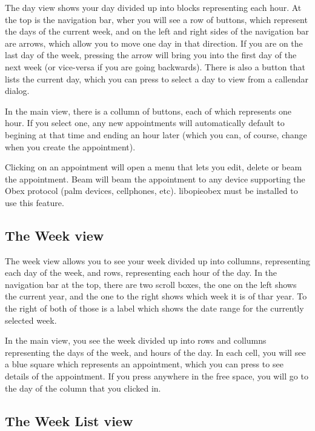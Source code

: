 \documentclass[12pt,letterpaper,oneside, openany]{book} \usepackage[latin1] {inputenc}
\begin{document}
The day view shows your day divided up into blocks representing each hour. At the top is the navigation bar, wher you will see a row of buttons, which represent the days of the current week, and on the left and right sides of the navigation bar are arrows, which allow you to move one day in that direction. If you are on the last day of the week, pressing the arrow will bring you into the first day of the next week (or vice-versa if you are going backwards). There is also a button that lists the current day, which you can press to select a day to view from a callendar dialog. 

In the main view, there is a collumn of buttons, each of which represents one hour. If you select one, any new appointments will automatically default to begining at that time and ending an hour later (which you can, of course, change when you create the appointment). 

Clicking on an appointment will open a menu that lets you edit, delete or beam the appointment. Beam will beam the appointment to any device supporting the Obex protocol (palm devices, cellphones, etc). libopieobex must be installed to use this feature. 

\subsection{The Week view}

The week view allows you to see your week divided up into collumns, representing each day of the week, and rows, representing each hour of the day. In the navigation bar at the top, there are two scroll boxes, the one on the left shows the current year, and the one to the right shows which week it is of thar year. To the right of both of those is a label which shows the date range for the currently selected week. 

In the main view, you see the week divided up into rows and collumns representing the days of the week, and hours of the day. In each cell, you will see a blue square which represents an appointment, which you can press to see details of the appointment. If you press anywhere in the free space, you will go to the day of the column that you clicked in. 

\subsection{The Week List view}
\end{document}
